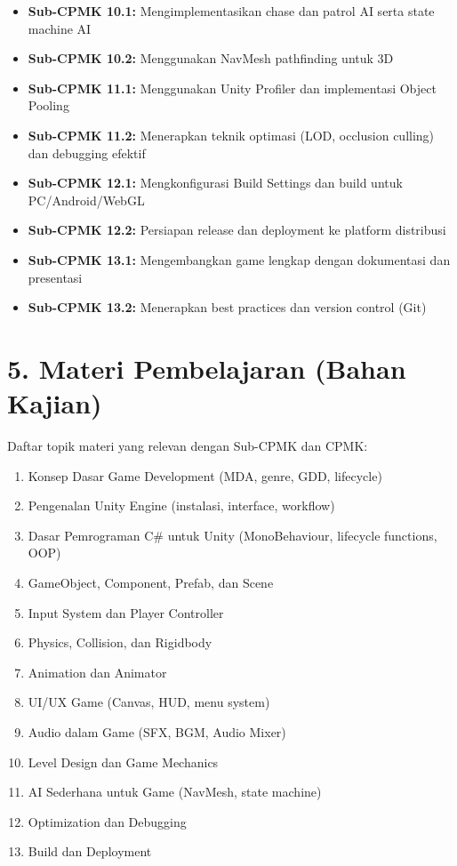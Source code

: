 \documentclass[12pt,a4paper]{article}
\begin{document}
\begin{itemize}[leftmargin=*]
  \item \textbf{Sub-CPMK 10.1:} Mengimplementasikan chase dan patrol AI serta state machine AI
  \item \textbf{Sub-CPMK 10.2:} Menggunakan NavMesh pathfinding untuk 3D
  \item \textbf{Sub-CPMK 11.1:} Menggunakan Unity Profiler dan implementasi Object Pooling
  \item \textbf{Sub-CPMK 11.2:} Menerapkan teknik optimasi (LOD, occlusion culling) dan debugging efektif
  \item \textbf{Sub-CPMK 12.1:} Mengkonfigurasi Build Settings dan build untuk PC/Android/WebGL
  \item \textbf{Sub-CPMK 12.2:} Persiapan release dan deployment ke platform distribusi
  \item \textbf{Sub-CPMK 13.1:} Mengembangkan game lengkap dengan dokumentasi dan presentasi
  \item \textbf{Sub-CPMK 13.2:} Menerapkan best practices dan version control (Git)
\end{itemize}

\vspace{0.5cm}

\section*{5. Materi Pembelajaran (Bahan Kajian)}

Daftar topik materi yang relevan dengan Sub-CPMK dan CPMK:

\begin{enumerate}[leftmargin=*]
  \item Konsep Dasar Game Development (MDA, genre, GDD, lifecycle)
  \item Pengenalan Unity Engine (instalasi, interface, workflow)
  \item Dasar Pemrograman C\# untuk Unity (MonoBehaviour, lifecycle functions, OOP)
  \item GameObject, Component, Prefab, dan Scene
  \item Input System dan Player Controller
  \item Physics, Collision, dan Rigidbody
  \item Animation dan Animator
  \item UI/UX Game (Canvas, HUD, menu system)
  \item Audio dalam Game (SFX, BGM, Audio Mixer)
  \item Level Design dan Game Mechanics
  \item AI Sederhana untuk Game (NavMesh, state machine)
  \item Optimization dan Debugging
  \item Build dan Deployment
\end{enumerate}
\end{document}
